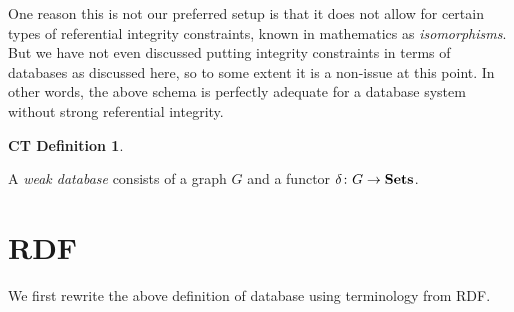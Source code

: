 \documentclass{amsart}
\def\to{\rightarrow}
\def\taking{\colon}
\def\Sets{{\bf Sets}}
\theoremstyle{remark}
\theoremstyle{definition}
\newtheorem{ctdef}{CT Definition}
\begin{document}
One reason this is not our preferred setup is that it does not allow for certain types of referential integrity constraints, known in mathematics as {\em isomorphisms}.  But we have not even discussed putting integrity constraints in terms of databases as discussed here, so to some extent it is a non-issue at this point.  In other words, the above schema is perfectly adequate for a database system without strong referential integrity.

\begin{ctdef}\label{ct:weak database}

A {\em weak database} consists of a graph $G$ and a functor $\delta\taking G\to\Sets$.

\end{ctdef}

\section{RDF}\label{sec:RDF}

We first rewrite the above definition of database using terminology from RDF.
\end{document}

